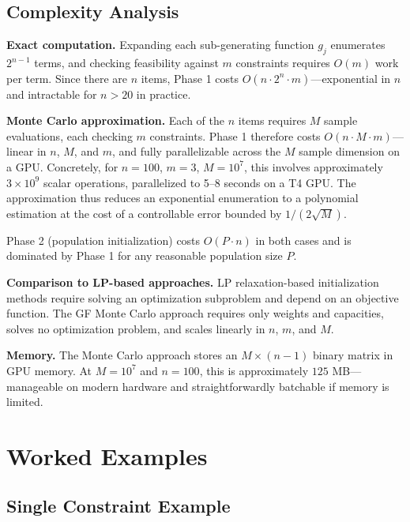\documentclass[twocolumn]{article}
\begin{document}
\subsection{Complexity Analysis}
\label{sec:complexity}

\noindent \textbf{Exact computation.} Expanding each sub-generating 
function $g_j$ enumerates $2^{n-1}$ terms, and checking feasibility 
against $m$ constraints requires $O(m)$ work per term. Since there are 
$n$ items, Phase 1 costs $O(n \cdot 2^n \cdot m)$---exponential in $n$ 
and intractable for $n > 20$ in practice.

\noindent \textbf{Monte Carlo approximation.} Each of the $n$ items 
requires $M$ sample evaluations, each checking $m$ constraints. Phase 1 
therefore costs $O(n \cdot M \cdot m)$---linear in $n$, $M$, and $m$, 
and fully parallelizable across the $M$ sample dimension on a GPU. 
Concretely, for $n = 100$, $m = 3$, $M = 10^7$, this involves 
approximately $3 \times 10^9$ scalar operations, parallelized to 5--8 
seconds on a T4 GPU. The approximation thus reduces an exponential 
enumeration to a polynomial estimation at the cost of a controllable 
error bounded by $1/(2\sqrt{M})$.

Phase 2 (population initialization) costs $O(P \cdot n)$ in both cases 
and is dominated by Phase 1 for any reasonable population size $P$.

\noindent \textbf{Comparison to LP-based approaches.} LP relaxation-based 
initialization methods require solving an optimization subproblem and 
depend on an objective function. The GF Monte Carlo approach requires 
only weights and capacities, solves no optimization problem, and scales 
linearly in $n$, $m$, and $M$.

\noindent \textbf{Memory.} The Monte Carlo approach stores an 
$M \times (n-1)$ binary matrix in GPU memory. At $M = 10^7$ and 
$n = 100$, this is approximately $125$ MB---manageable on modern 
hardware and straightforwardly batchable if memory is limited.

\section{Worked Examples}
\label{sec:examples}

\subsection{Single Constraint Example}
\end{document}
